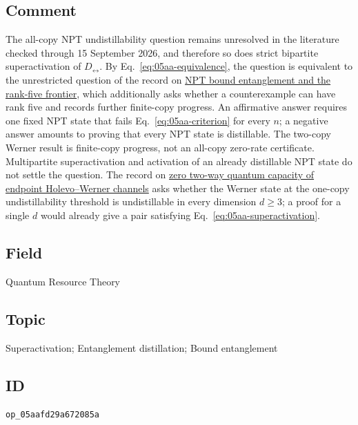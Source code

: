 \subsection*{Comment}

The all-copy NPT undistillability question remains unresolved in the literature checked through 15 September 2026, and therefore so does strict bipartite superactivation of $D_\leftrightarrow$. By Eq.~\eqref{eq:05aa-equivalence}, the question is equivalent to the unrestricted question of the record on \href{https://qiqc-op.com/problem/op_74c4ffb5b042baf2/}{NPT bound entanglement and the rank-five frontier}, which additionally asks whether a counterexample can have rank five and records further finite-copy progress. An affirmative answer requires one fixed NPT state that fails Eq.~\eqref{eq:05aa-criterion} for every $n$; a negative answer amounts to proving that every NPT state is distillable. The two-copy Werner result is finite-copy progress, not an all-copy zero-rate certificate. Multipartite superactivation and activation of an already distillable NPT state do not settle the question. The record on \href{https://qiqc-op.com/problem/op_fc663252f5664f40/}{zero two-way quantum capacity of endpoint Holevo--Werner channels} asks whether the Werner state at the one-copy undistillability threshold is undistillable in every dimension $d\geq3$; a proof for a single $d$ would already give a pair satisfying Eq.~\eqref{eq:05aa-superactivation}.

\subsection*{Field}

Quantum Resource Theory

\subsection*{Topic}

Superactivation; Entanglement distillation; Bound entanglement

\subsection*{ID}

\texttt{op\_05aafd29a672085a}
